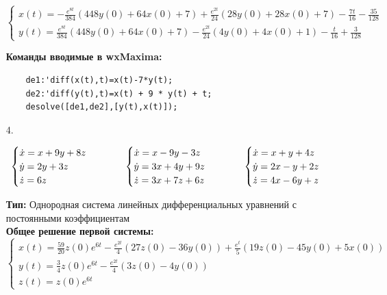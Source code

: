 \documentclass[a4paper, 12pt, oneside]{scrartcl}
\newcommand\tab[1][1cm]{\hspace*{#1}}
\begin{document}
\begin{enumerate}
		\begin{equation*}
			\begin{cases}
			x(t)=-\frac{e^{8t}}{384}(448y(0)+64x(0)+7)+\frac{e^{2t}}{24}(28y(0)+28x(0)+7)-\frac{7t}{16}-\frac{35}{128} \\
			y(t)=\frac{e^{8t}}{384}(448y(0)+64x(0)+7)-\frac{e^{2t}}{24}(4y(0)+4x(0)+1)-\frac{t}{16}+\frac{3}{128} 
			\end{cases}
		\end{equation*} 
		
		\textbf{Команды вводимые в wxMaxima: }
		\begin{verbatim}
	de1:'diff(x(t),t)=x(t)-7*y(t);
	de2:'diff(y(t),t)=x(t) + 9 * y(t) + t;
	desolve([de1,de2],[y(t),x(t)]);
	\end{verbatim}
		
		\item[4.]

\begin{equation*}
		  	\begin{cases}
   				\dot{x} = x + 9y + 8z \\
   				\dot{y} = 2y + 3z \\
   				\dot{z} = 6z
		  	\end{cases}
		  	\tab \begin{cases}
				\dot{x} = x - 9y - 3z \\
				\dot{y} = 3x + 4y + 9z \\
				\dot{z} = 3x + 7z + 6z 
			\end{cases}
			\tab \begin{cases}
				\dot{x} = x + y + 4z \\
				\dot{y} = 2x - y + 2z \\
				\dot{z} = 4x - 6y + z 
			\end{cases}

		\end{equation*}

		\textbf{Тип:}
		Однородная система линейных  дифференциальных уравнений с постоянными коэффициентам  \\
	
		\textbf{Общее решение первой системы: }
		\begin{equation*}
			\begin{cases}
			x(t)=\frac{59}{20}z(0)e^{6t}-\frac{e^{2t}}{4}(27z(0)-36y(0))+\frac{e^{t}}{5}(19z(0)-45y(0)+5x(0)) \\
			y(t)=\frac{3}{4}z(0)e^{6t}-\frac{e^{2t}}{4}(3z(0)-4y(0)) \\
			z(t)=z(0)e^{6t}
			\end{cases}
		\end{equation*}


\end{enumerate}
\end{document}
